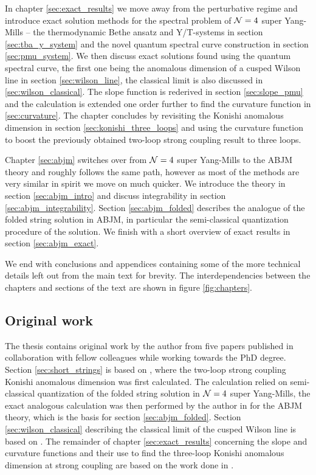 In chapter \ref{sec:exact_results} we move away from the perturbative regime and introduce exact solution methods for the spectral problem of $\mathcal{N}=4$ super Yang-Mills -- the thermodynamic Bethe ansatz and Y/T-systems in section \ref{sec:tba_y_system} and the novel quantum spectral curve construction in section \ref{sec:pmu_system}.
We then discuss exact solutions found using the quantum spectral curve, the first one being the anomalous dimension of a cusped Wilson line in section \ref{sec:wilson_line}, the classical limit is also discussed in \ref{sec:wilson_classical}.
The slope function is rederived in section \ref{sec:slope_pmu} and the calculation is extended one order further to find the curvature function in \ref{sec:curvature}.
The chapter concludes by revisiting the Konishi anomalous dimension in section \ref{sec:konishi_three_loops} and using the curvature function to boost the previously obtained two-loop strong coupling result to three loops.
 
Chapter \ref{sec:abjm} switches over from $\mathcal{N}=4$ super Yang-Mills to the ABJM theory and roughly follows the same path, however as most of the methods are very similar in spirit we move on much quicker.
We introduce the theory in section \ref{sec:abjm_intro} and discuss integrability in section \ref{sec:abjm_integrability}. 
Section \ref{sec:abjm_folded} describes the analogue of the folded string solution in ABJM, in particular the semi-classical quantization procedure of the solution.
We finish with a short overview of exact results in section \ref{sec:abjm_exact}.

We end with conclusions and appendices containing some of the more technical details left out from the main text for brevity.
The interdependencies between the chapters and sections of the text are shown in figure \ref{fig:chapters}.

\newpage
\subsection{Original work}

The thesis contains original work by the author from five papers published in collaboration with fellow colleagues while working towards the PhD degree. 
Section \ref{sec:short_strings} is based on \cite{Gromov:2011bz}, where the two-loop strong coupling Konishi anomalous dimension was first calculated.
The calculation relied on semi-classical quantization of the folded string solution in $\mathcal{N}=4$ super Yang-Mills, the exact analogous calculation was then performed by the author in \cite{Beccaria:2012vb,Beccaria:2012qd} for the ABJM theory, which is the basis for section \ref{sec:abjm_folded}.
Section \ref{sec:wilson_classical} describing the classical limit of the cusped Wilson line is based on \cite{Sizov:2013joa}.
The remainder of chapter \ref{sec:exact_results} concerning the slope and curvature functions and their use to find the three-loop Konishi anomalous dimension at strong coupling are based on the work done in \cite{Gromov:2014bva}. 

